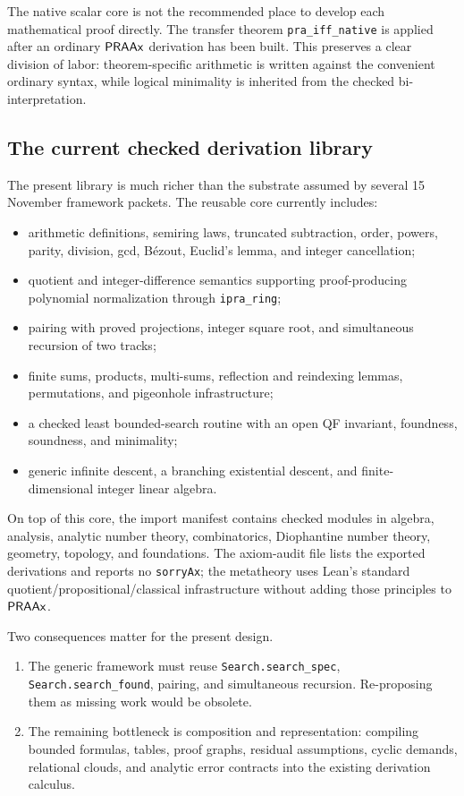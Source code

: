 The native scalar core is not the recommended place to develop each mathematical proof directly.  The transfer theorem \texttt{pra\_iff\_native} is applied after an ordinary \(\mathsf{PRAAx}\) derivation has been built.  This preserves a clear division of labor: theorem-specific arithmetic is written against the convenient ordinary syntax, while logical minimality is inherited from the checked bi-interpretation.

\subsection{The current checked derivation library}

The present  library is much richer than the substrate assumed by several 15 November framework packets.  The reusable core currently includes:
\begin{itemize}
  \item arithmetic definitions, semiring laws, truncated subtraction, order, powers, parity, division, gcd, B\'ezout, Euclid's lemma, and integer cancellation;
  \item quotient and integer-difference semantics supporting proof-producing polynomial normalization through \texttt{ipra\_ring};
  \item pairing with proved projections, integer square root, and simultaneous recursion of two tracks;
  \item finite sums, products, multi-sums, reflection and reindexing lemmas, permutations, and pigeonhole infrastructure;
  \item a checked least bounded-search routine with an open QF invariant, foundness, soundness, and minimality;
  \item generic infinite descent, a branching existential descent, and finite-dimensional integer linear algebra.
\end{itemize}
On top of this core, the import manifest contains checked modules in algebra, analysis, analytic number theory, combinatorics, Diophantine number theory, geometry, topology, and foundations.  The axiom-audit file lists the exported derivations and reports no \texttt{sorryAx}; the metatheory uses Lean's standard quotient/propositional/classical infrastructure without adding those principles to \(\mathsf{PRAAx}\).

Two consequences matter for the present design.
\begin{enumerate}[label=(\arabic*)]
  \item The generic framework must reuse \texttt{Search.search\_spec}, \texttt{Search.search\_found}, pairing, and simultaneous recursion.  Re-proposing them as missing work would be obsolete.
  \item The remaining bottleneck is composition and representation: compiling bounded formulas, tables, proof graphs, residual assumptions, cyclic demands, relational clouds, and analytic error contracts into the existing derivation calculus.
\end{enumerate}

